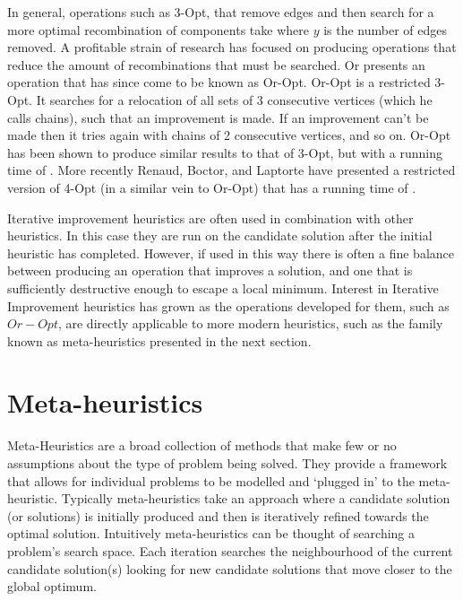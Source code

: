 In general, operations such as 3-Opt, that remove edges and then search for a more optimal recombination of components take  where $y$ is the number of edges removed. A profitable strain of research has focused on producing operations that reduce the amount of recombinations that must be searched. Or presents an operation that has since come to be known as Or-Opt\cite{Or:1976}. Or-Opt is a restricted 3-Opt. It searches for a relocation of all sets of 3 consecutive vertices (which he calls chains), such that an improvement is made. If an improvement can't be made then it tries again with chains of 2 consecutive vertices, and so on. Or-Opt has been shown to produce similar results to that of 3-Opt, but with a running time of . More recently Renaud, Boctor, and Laptorte have presented a restricted version of 4-Opt (in a similar vein to Or-Opt) that has a running time of \cite{RBL:1996}. 

Iterative improvement heuristics are often used in combination with other heuristics. In this case they are run on the candidate solution after the initial heuristic has completed. However, if used in this way there is often a fine balance between producing an operation that improves a solution, and one that is sufficiently destructive enough to escape a local minimum. Interest in Iterative Improvement heuristics has grown as the operations developed for them, such as $Or-Opt$, are directly applicable to more modern heuristics, such as the family known as meta-heuristics presented in the next section. 

\section{Meta-heuristics}
\label{sec:mh}

Meta-Heuristics are a broad collection of methods that make few or no assumptions about the type of problem being solved. They provide a framework that allows for individual problems to be modelled and `plugged in' to the meta-heuristic. Typically meta-heuristics take an approach where a candidate solution (or solutions) is initially produced and then is iteratively refined towards the optimal solution. Intuitively meta-heuristics can be thought of searching a problem's search space. Each iteration searches the neighbourhood of the current candidate solution(s) looking for new candidate solutions that move closer to the global optimum.

